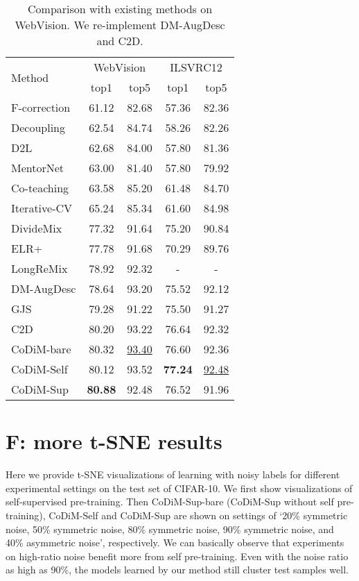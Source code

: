 \documentclass[letterpaper]{article} \usepackage{aaai22}  \usepackage{times}  \usepackage{helvet}  \usepackage{courier}  \usepackage[hyphens]{url}  \usepackage{graphicx} \usepackage{subfigure}
\begin{document}
\begin{table*}[!htbp]
\begin{center}
\begin{tabular}{lcccc}
\hline
\multirow{2}{*}{Method} & \multicolumn{2}{c}{WebVision} & \multicolumn{2}{c}{ILSVRC12} \\
 & top1 & top5 & top1 & top5 \\
\hline
F-correction \cite{patrini2017making} & 61.12 & 82.68 & 57.36 & 82.36 \\
Decoupling \cite{malach2017decoupling} & 62.54 & 84.74 & 58.26 & 82.26 \\
D2L \cite{ma2018dimensionality} & 62.68 & 84.00 & 57.80 & 81.36 \\
MentorNet \cite{jiang2018mentornet} & 63.00 & 81.40 & 57.80 & 79.92 \\
Co-teaching \cite{han2018co} & 63.58 & 85.20 & 61.48 & 84.70 \\
Iterative-CV \cite{chen2019understanding} & 65.24 & 85.34 & 61.60 & 84.98 \\
DivideMix \cite{li2020dividemix} & 77.32 & 91.64 & 75.20 & 90.84 \\
ELR+ \cite{liu2020early} & 77.78 & 91.68 & 70.29 & 89.76 \\
LongReMix \cite{cordeiro2021longremix} & 78.92 & 92.32 & - & - \\
DM-AugDesc\cite{nishi2021augmentation} & 78.64 & 93.20 & 75.52 & 92.12 \\ GJS \cite{englesson2021generalized} & 79.28 & 91.22 & 75.50 & 91.27 \\
C2D\cite{zheltonozhskii2021contrast} & 80.20 & 93.22 & 76.64 & 92.32 \\ \hline
CoDiM-bare  & 80.32 & \underline{93.40} & 76.60 & 92.36 \\CoDiM-Self & 80.12 & 93.52 & \textbf{77.24} & \underline{92.48}\\ CoDiM-Sup & \textbf{80.88} & 92.48 & 76.52 & 91.96 \\
\hline
\end{tabular}
\end{center}
\caption{Comparison with existing methods on WebVision. We re-implement DM-AugDesc and C2D.}
\label{tab:table4_complete}
\end{table*}

\clearpage
\section{F: more t-SNE results}
Here we provide t-SNE visualizations of learning with noisy labels for different experimental settings on the test set of CIFAR-10. We first show visualizations of self-supervised pre-training. Then CoDiM-Sup-bare (CoDiM-Sup without self pre-training), CoDiM-Self and CoDiM-Sup are shown on settings of `20\% symmetric noise, 50\% symmetric noise, 80\% symmetric noise, 90\% symmetric noise, and 40\% asymmetric noise', respectively. We can basically observe that experiments on high-ratio noise benefit more from self pre-training. Even with the noise ratio as high as 90\%, the models learned by our method still cluster test samples well. 
\end{document}
